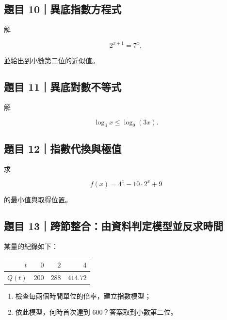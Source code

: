 \documentclass[11pt,a4paper]{article}
\newcounter{none}
\providecommand{\tightlist}{%
  \setlength{\itemsep}{0pt}\setlength{\parskip}{0pt}}
\begin{document}
\subsection{題目 10｜異底指數方程式}\label{ux984cux76ee-10ux7570ux5e95ux6307ux6578ux65b9ux7a0bux5f0f}

解

\[
2^{x+1}=7^x,
\]

並給出到小數第二位的近似值。

\subsection{題目 11｜異底對數不等式}\label{ux984cux76ee-11ux7570ux5e95ux5c0dux6578ux4e0dux7b49ux5f0f}

解

\[
\log_3x\le\log_9(3x).
\]

\subsection{題目 12｜指數代換與極值}\label{ux984cux76ee-12ux6307ux6578ux4ee3ux63dbux8207ux6975ux503c}

求

\[
f(x)=4^x-10\cdot2^x+9
\]

的最小值與取得位置。

\subsection{題目 13｜跨節整合：由資料判定模型並反求時間}\label{ux984cux76ee-13ux8de8ux7bc0ux6574ux5408ux7531ux8cc7ux6599ux5224ux5b9aux6a21ux578bux4e26ux53cdux6c42ux6642ux9593}

某量的紀錄如下：

{\def\LTcaptype{none} %
\begin{longtable}[]{@{}rrrr@{}}
\toprule\noalign{}
\(t\) & \(0\) & \(2\) & \(4\) \\
\midrule\noalign{}
\endhead
\bottomrule\noalign{}
\endlastfoot
\(Q(t)\) & \(200\) & \(288\) & \(414.72\) \\
\end{longtable}
}

\begin{enumerate}
\def\labelenumi{\arabic{enumi}.}
\tightlist
\item
  檢查每兩個時間單位的倍率，建立指數模型；
\item
  依此模型，何時首次達到 \(600\)？答案取到小數第二位。
\end{enumerate}
\end{document}
